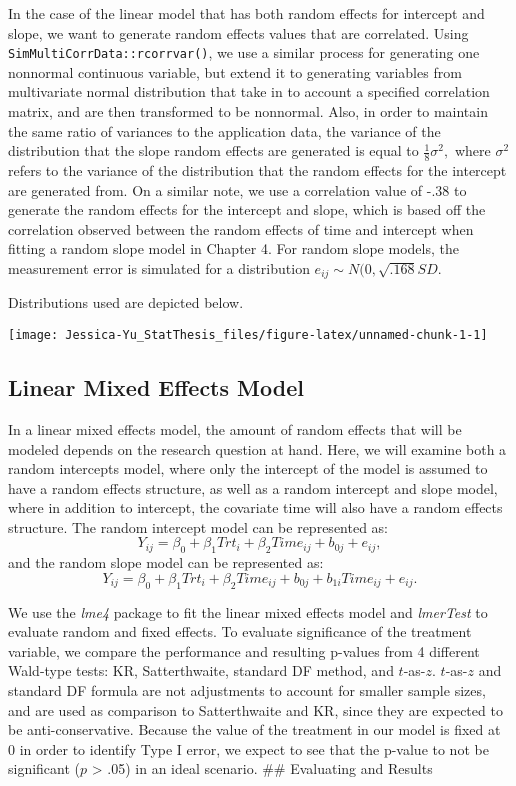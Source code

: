 \documentclass[12pt, twoside]{amherstthesis}
\begin{document}
In the case of the linear model that has both random effects for intercept and slope, we want to generate random effects values that are correlated. Using \texttt{SimMultiCorrData::rcorrvar()}, we use a similar process for generating one nonnormal continuous variable, but extend it to generating variables from multivariate normal distribution that take in to account a specified correlation matrix, and are then transformed to be nonnormal. Also, in order to maintain the same ratio of variances to the application data, the variance of the distribution that the slope random effects are generated is equal to \(\frac{1}{8}\sigma^2,\) where \(\sigma^2\) refers to the variance of the distribution that the random effects for the intercept are generated from. On a similar note, we use a correlation value of -.38 to generate the random effects for the intercept and slope, which is based off the correlation observed between the random effects of time and intercept when fitting a random slope model in Chapter 4. For random slope models, the measurement error is simulated for a distribution \(e_{ij}\sim\mathit{N}(0,\sqrt{.168}SD.\)

Distributions used are depicted below.
\begin{center}\texttt{[image: Jessica-Yu\_StatThesis\_files/figure-latex/unnamed-chunk-1-1]} \end{center}

\hypertarget{linear-mixed-effects-model}{%
\subsection{Linear Mixed Effects Model}\label{linear-mixed-effects-model}}

In a linear mixed effects model, the amount of random effects that will be modeled depends on the research question at hand. Here, we will examine both a random intercepts model, where only the intercept of the model is assumed to have a random effects structure, as well as a random intercept and slope model, where in addition to intercept, the covariate time will also have a random effects structure. The random intercept model can be represented as: \[Y_{ij} = \beta_0 + \beta_1Trt_i + \beta_2Time_{ij} + b_{0j} + e_{ij},\] and the random slope model can be represented as: \[Y_{ij} = \beta_0 + \beta_1Trt_i + \beta_2Time_{ij} + b_{0j} + b_{1i}Time_{ij} + e_{ij}.\]

We use the \emph{lme4} package to fit the linear mixed effects model and \emph{lmerTest} to evaluate random and fixed effects. To evaluate significance of the treatment variable, we compare the performance and resulting p-values from 4 different Wald-type tests: KR, Satterthwaite, standard DF method, and \(t\)-as-\(z\). \(t\)-as-\(z\) and standard DF formula are not adjustments to account for smaller sample sizes, and are used as comparison to Satterthwaite and KR, since they are expected to be anti-conservative. Because the value of the treatment in our model is fixed at 0 in order to identify Type I error, we expect to see that the p-value to not be significant (\(p\) \textgreater{} .05) in an ideal scenario.
\#\# Evaluating and Results
\end{document}
